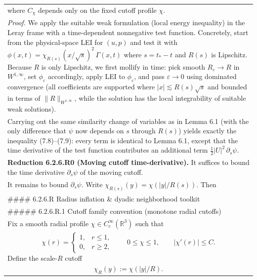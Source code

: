\documentclass[
  11pt,
]{article}
\begin{document}
\begin{longtable}[]{@{}
  >{\raggedleft\arraybackslash}p{}@{}}
\begin{equation}
\tag{7.10}
\end{equation}
where \(C_\chi\) depends only on the fixed cutoff profile \(\chi\). \\
\emph{Proof.} We apply the suitable weak formulation (local energy inequality) in the Leray frame with a time-dependent nonnegative test function. Concretely, start from the physical-space LEI for \((u,p)\) and test it with \(\phi(x,t)=\chi_{R(s)}(x/\sqrt{s})^2\,\Gamma(x,t)\) where \(s=t_\ast-t\) and \(R(s)\) is Lipschitz. Because \(R\) is only Lipschitz, we first mollify in time: pick smooth \(R_\varepsilon\to R\) in \(W^{1,\infty}\), set \(\phi_\varepsilon\) accordingly, apply LEI to \(\phi_\varepsilon\), and pass \(\varepsilon\to0\) using dominated convergence (all coefficients are supported where \(|x|\lesssim R(s)\sqrt{s}\) and bounded in terms of \(\|R\|_{W^{1,\infty}}\), while the solution has the local integrability of suitable weak solutions). \\
Carrying out the same similarity change of variables as in Lemma 6.1 (with the only difference that \(\psi\) now depends on \(s\) through \(R(s)\)) yields exactly the inequality (7.8)--(7.9): every term is identical to Lemma 6.1, except that the time derivative of the test function contributes an additional term \(\tfrac12|U|^2\,\partial_s\psi\). \\
\textbf{Reduction 6.2.6.R0 (Moving cutoff time-derivative).} It suffices to bound the time derivative \(\partial_s\psi\) of the moving cutoff. \\
It remains to bound \(\partial_s\psi\). Write \(\chi_{R(s)}(y)=\chi(|y|/R(s))\). Then \\
\#\#\#\# 6.2.6.R Radius inflation \& dyadic neighborhood toolkit \\
\#\#\#\#\# 6.2.6.R.1 Cutoff family convention (monotone radial cutoffs) \\
Fix a smooth radial profile \(\chi\in C_c^\infty(\mathbb{R}^3)\) such that \\
\begin{equation}
\chi(r)=
\begin{cases}
1,& r\le 1,\\
0,& r\ge 2,
\end{cases}
\qquad 0\le \chi\le 1,\qquad |\chi'(r)|\le C.
\tag{7.R1}\label{eq:7R1_profile}
\end{equation}
Define the scale-\(R\) cutoff \\
\begin{equation}
\chi_R(y):=\chi(|y|/R).
\tag{7.R2}\label{eq:7R2_chiR}
\end{equation}

\end{longtable}
\end{document}
